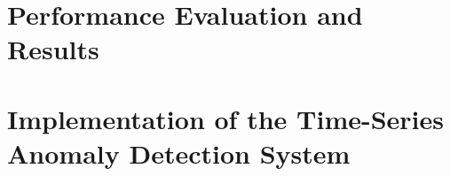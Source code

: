 \section{Performance Evaluation and Results}
\label{sec:performance_evaluation_results}

\section{Implementation of the Time-Series Anomaly Detection System}
\label{sec:implementation_of_the_time_series_anomaly_detection_system}



